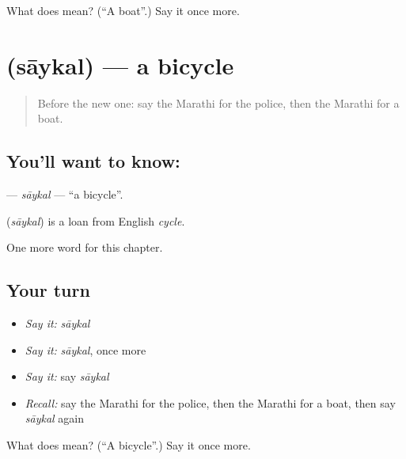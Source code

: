 \begin{tcolorbox}[breakable,colback=teal!4,colframe=teal!35!black,title={Before you move on}]
What does  mean? (\textquotedblleft{}A boat\textquotedblright{}.) Say it once more.
\end{tcolorbox}
\section[\texorpdfstring{\mr{सायकल} (sāykal)}{सायकल (sāykal)}]{ (sāykal) — a bicycle}

\label{lesson:MR-C115-saykal}



\begin{quote}
Before the new one: say the Marathi for the police, then the Marathi for a boat.
\end{quote}

\subsection*{You'll want to know: }
\textbf{} — \emph{sāykal} — \textquotedblleft{}a bicycle\textquotedblright{}.

\begin{cousinweb}
\textbf{} (\emph{sāykal}) is a loan from English \emph{cycle}.
\end{cousinweb}

\begin{grammarlens}[title={What you've built}]
One more word for this chapter.
\end{grammarlens}

\subsection*{Your turn}
\begin{itemize}
\raggedright
  \item \emph{Say it:} \emph{sāykal}
  \item \emph{Say it:} \emph{sāykal}, once more
  \item \emph{Say it:} say \emph{sāykal}
  \item \emph{Recall:} say the Marathi for the police, then the Marathi for a boat, then say \emph{sāykal} again
\end{itemize}

\begin{tcolorbox}[breakable,colback=teal!4,colframe=teal!35!black,title={Before you move on}]
What does  mean? (\textquotedblleft{}A bicycle\textquotedblright{}.) Say it once more.
\end{tcolorbox}
